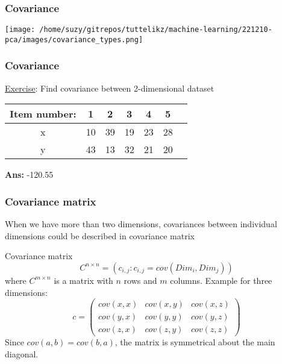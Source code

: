 \documentclass{beamer}
\begin{document}
    \begin{frame}
        \frametitle{Covariance}
        \begin{center}
        \texttt{[image: /home/suzy/gitrepos/tuttelikz/machine-learning/221210-pca/images/covariance\_types.png]}
        \end{center}
    \end{frame}

    \begin{frame}
            \frametitle{Covariance}
            \underline{Exercise}: Find covariance between 2-dimensional dataset
            \begin{center}
                \begin{tabular}{ |c|c|c|c|c|c|c| } 
                \hline
                Item number: & 1 & 2 & 3 & 4 & 5 \\
                \hline
                x & 10  & 39 & 19 & 23 & 28 \\ 
                y & 43  & 13 & 32 & 21 & 20 \\ 
                \hline
                \end{tabular}
            \end{center} 
            \textbf{Ans: } -120.55
    \end{frame}

    \begin{frame}
        \frametitle{Covariance matrix}
        When we have more than two dimensions, covariances between individual dimensions could be described in covariance matrix\\
        
        \begin{center}    
            \begin{block}{Covariance matrix}
                \begin{equation}
                C^{n\times n} = (c_{i,j}: c_{i,j}=cov(Dim_{i}, Dim_{j}))
                \end{equation}
                where $C^{m\times n}$ is a matrix with $n$ rows and $m$ columns. Example for three dimensions:
                \begin{equation}    %
                    c = \begin{pmatrix}
                            cov(x,x) & cov(x,y) & cov(x,z)\\
                            cov(y,x) & cov(y,y) & cov(y,z)\\
                            cov(z,x) & cov(z,y) & cov(z,z)
                        \end{pmatrix}
                \end{equation}
                Since $cov(a,b) = cov(b,a)$, the matrix is symmetrical about the main diagonal. 
            \end{block}
        \end{center}
    \end{frame}
\end{document}
